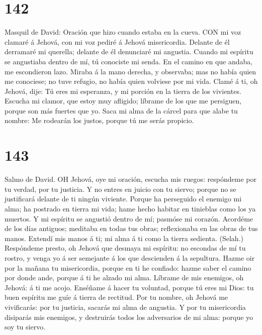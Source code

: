 \hypertarget{section-141}{%
\section{142}\label{section-141}}

 Masquil de David: Oración que hizo cuando estaba en la
cueva. CON mi voz clamaré á Jehová, con mi voz pediré á Jehová
misericordia.  Delante de él derramaré mi querella; delante
de él denunciaré mi angustia.  Cuando mi espíritu se
angustiaba dentro de mí, tú conociste mi senda. En el camino en que
andaba, me escondieron lazo.  Miraba á la mano derecha, y
observaba; mas no había quien me conociese; no tuve refugio, no había
quien volviese por mi vida.  Clamé á ti, oh Jehová, dije: Tú
eres mi esperanza, y mi porción en la tierra de los vivientes.
 Escucha mi clamor, que estoy muy afligido; líbrame de los
que me persiguen, porque son más fuertes que yo.  Saca mi
alma de la cárcel para que alabe tu nombre: Me rodearán los justos,
porque tú me serás propicio.

\hypertarget{section-142}{%
\section{143}\label{section-142}}

 Salmo de David. OH Jehová, oye mi oración, escucha mis
ruegos: respóndeme por tu verdad, por tu justicia.  Y no
entres en juicio con tu siervo; porque no se justificará delante de ti
ningún viviente.  Porque ha perseguido el enemigo mi alma;
ha postrado en tierra mi vida; hame hecho habitar en tinieblas como los
ya muertos.  Y mi espíritu se angustió dentro de mí; pasmóse
mi corazón.  Acordéme de los días antiguos; meditaba en
todas tus obras; reflexionaba en las obras de tus manos. 
Extendí mis manos á ti; mi alma á ti como la tierra sedienta. (Selah.)
 Respóndeme presto, oh Jehová que desmaya mi espíritu: no
escondas de mí tu rostro, y venga yo á ser semejante á los que
descienden á la sepultura.  Hazme oir por la mañana tu
misericordia, porque en ti he confiado: hazme saber el camino por donde
ande, porque á ti he alzado mi alma.  Líbrame de mis
enemigos, oh Jehová: á ti me acojo.  Enséñame á hacer tu
voluntad, porque tú eres mi Dios: tu buen espíritu me guíe á tierra de
rectitud.  Por tu nombre, oh Jehová me vivificarás: por tu
justicia, sacarás mi alma de angustia.  Y por tu
misericordia disiparás mis enemigos, y destruirás todos los adversarios
de mi alma: porque yo soy tu siervo.

